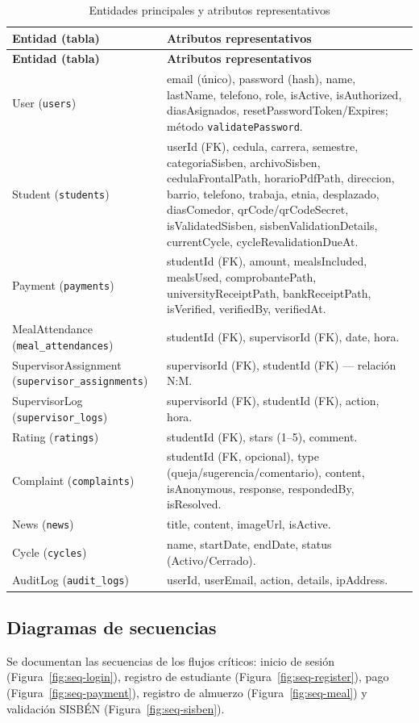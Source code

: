 \documentclass[stu,11pt,floatsintext]{apa7}
\begin{document}
\begin{longtable}{L{0.20\textwidth} L{0.74\textwidth}}
\caption{Entidades principales y atributos representativos}\label{tab:entidades}\\
\toprule
\textbf{Entidad (tabla)} & \textbf{Atributos representativos} \\
\midrule
\endfirsthead
\toprule
\textbf{Entidad (tabla)} & \textbf{Atributos representativos} \\
\midrule
\endhead
\bottomrule
\endlastfoot
User (\texttt{users}) & email (único), password (hash), name, lastName, telefono, role, isActive, isAuthorized, diasAsignados, resetPasswordToken/Expires; método \texttt{validatePassword}. \\
Student (\texttt{students}) & userId (FK), cedula, carrera, semestre, categoriaSisben, archivoSisben, cedulaFrontalPath, horarioPdfPath, direccion, barrio, telefono, trabaja, etnia, desplazado, diasComedor, qrCode/qrCodeSecret, isValidatedSisben, sisbenValidationDetails, currentCycle, cycleRevalidationDueAt. \\
Payment (\texttt{payments}) & studentId (FK), amount, mealsIncluded, mealsUsed, comprobantePath, universityReceiptPath, bankReceiptPath, isVerified, verifiedBy, verifiedAt. \\
MealAttendance (\texttt{meal\_attendances}) & studentId (FK), supervisorId (FK), date, hora. \\
SupervisorAssignment (\texttt{supervisor\_assignments}) & supervisorId (FK), studentId (FK) — relación N:M. \\
SupervisorLog (\texttt{supervisor\_logs}) & supervisorId (FK), studentId (FK), action, hora. \\
Rating (\texttt{ratings}) & studentId (FK), stars (1--5), comment. \\
Complaint (\texttt{complaints}) & studentId (FK, opcional), type (queja/sugerencia/comentario), content, isAnonymous, response, respondedBy, isResolved. \\
News (\texttt{news}) & title, content, imageUrl, isActive. \\
Cycle (\texttt{cycles}) & name, startDate, endDate, status (Activo/Cerrado). \\
AuditLog (\texttt{audit\_logs}) & userId, userEmail, action, details, ipAddress. \\
\end{longtable}

\subsection{Diagramas de secuencias}
Se documentan las secuencias de los flujos críticos: inicio de sesión
(Figura~\ref{fig:seq-login}), registro de estudiante (Figura~\ref{fig:seq-register}),
pago (Figura~\ref{fig:seq-payment}), registro de almuerzo (Figura~\ref{fig:seq-meal}) y
validación SISBÉN (Figura~\ref{fig:seq-sisben}).
\end{document}
